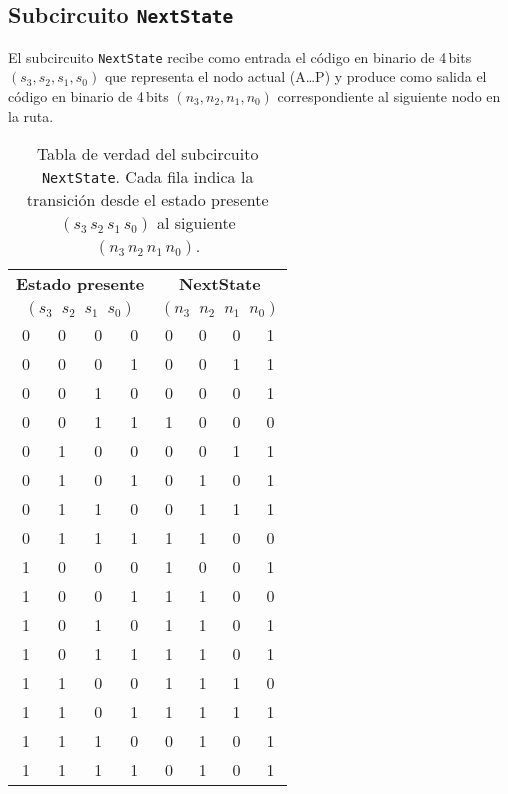 \documentclass[12pt]{article}
\begin{document}
\subsection*{Subcircuito \texttt{NextState}}

El subcircuito \texttt{NextState} recibe como entrada el código en binario de 4\,bits  
\((s_{3},s_{2},s_{1},s_{0})\) que representa el nodo actual (A…P) y produce como salida  
el código en binario de 4\,bits \((n_{3},n_{2},n_{1},n_{0})\) correspondiente al siguiente nodo en la ruta. 

\begin{table}[H]
  \centering
  \begin{tabular}{cccc|cccc}
    \multicolumn{4}{c|}{\bf Estado presente} & \multicolumn{4}{c}{\bf NextState}\\
    \multicolumn{4}{c|}{\((s_{3}\;\;s_{2}\;\;s_{1}\;\;s_{0})\)} & \multicolumn{4}{c}{\((n_{3}\;\;n_{2}\;\;n_{1}\;\;n_{0})\)}\\
    \hline
    0 & 0 & 0 & 0 & 0 & 0 & 0 & 1 \\ %
    0 & 0 & 0 & 1 & 0 & 0 & 1 & 1 \\ %
    0 & 0 & 1 & 0 & 0 & 0 & 0 & 1 \\ %
    0 & 0 & 1 & 1 & 1 & 0 & 0 & 0 \\ %
    0 & 1 & 0 & 0 & 0 & 0 & 1 & 1 \\ %
    0 & 1 & 0 & 1 & 0 & 1 & 0 & 1 \\ %
    0 & 1 & 1 & 0 & 0 & 1 & 1 & 1 \\ %
    0 & 1 & 1 & 1 & 1 & 1 & 0 & 0 \\ %
    1 & 0 & 0 & 0 & 1 & 0 & 0 & 1 \\ %
    1 & 0 & 0 & 1 & 1 & 1 & 0 & 0 \\ %
    1 & 0 & 1 & 0 & 1 & 1 & 0 & 1 \\ %
    1 & 0 & 1 & 1 & 1 & 1 & 0 & 1 \\ %
    1 & 1 & 0 & 0 & 1 & 1 & 1 & 0 \\ %
    1 & 1 & 0 & 1 & 1 & 1 & 1 & 1 \\ %
    1 & 1 & 1 & 0 & 0 & 1 & 0 & 1 \\ %
    1 & 1 & 1 & 1 & 0 & 1 & 0 & 1 \\ %
  \end{tabular}
  \caption{Tabla de verdad del subcircuito \texttt{NextState}. Cada fila indica la transición  
    desde el estado presente \((s_{3}\,s_{2}\,s_{1}\,s_{0})\) al siguiente \((n_{3}\,n_{2}\,n_{1}\,n_{0})\).}
\end{table}
\end{document}
